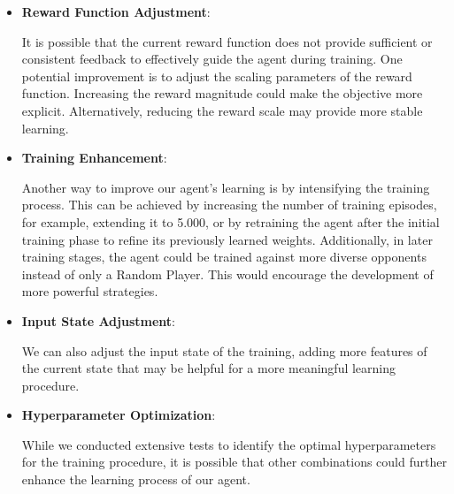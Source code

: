 \documentclass{article}
\begin{document}
\begin{itemize}
    \item \textbf{Reward Function Adjustment}:  
    
    It is possible that the current reward function does not provide sufficient or consistent feedback to effectively guide the agent during training. One potential improvement is to adjust the scaling parameters of the reward function. Increasing the reward magnitude could make the objective more explicit. Alternatively, reducing the reward scale may provide more stable learning.

    \item \textbf{Training Enhancement}:  

    Another way to improve our agent's learning is by intensifying the training process. This can be achieved by increasing the number of training episodes, for example, extending it to 5.000, or by retraining the agent after the initial training phase to refine its previously learned weights. Additionally, in later training stages, the agent could be trained against more diverse opponents instead of only a Random Player. This would encourage the development of more powerful strategies.

    \item \textbf{Input State Adjustment}: 

    We can also adjust the input state of the training, adding more features of the current state that may be helpful for a more meaningful learning procedure.

    \item \textbf{Hyperparameter Optimization}:

    While we conducted extensive tests to identify the optimal hyperparameters for the training procedure, it is possible that other combinations could further enhance the learning process of our agent.

    
    


    
\end{itemize}
\end{document}
